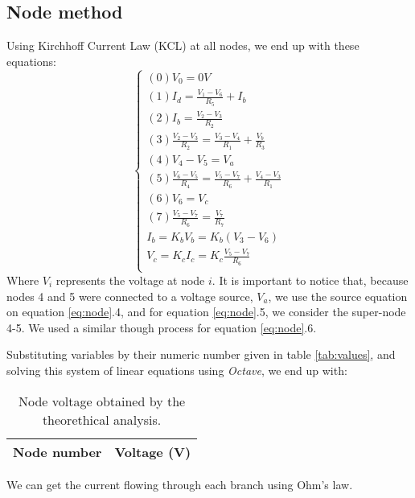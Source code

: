 \subsection{Node method}
Using Kirchhoff Current Law (KCL) at all nodes, we end up with these equations:
\begin{equation}\label{eq:node}
  \begin{cases}
  (0) V_0 = 0V \\
  (1) I_d = \frac{V_1 - V_6}{R_5} + I_b \\
  (2) I_b = \frac{V_2 - V_3}{R_2} \\
  (3) \frac{V_2 - V_3}{R_2} = \frac{V_3 - V_4}{R_1} + \frac{V_b}{R_3} \\
  (4) V_4 - V_5 = V_a \\
  (5) \frac{V_6 - V_5}{R_4} = \frac{V_5 - V_7}{R_6} + \frac{V_4 - V_3}{R_1} \\ %
  (6) V_6 = V_c \\
  (7) \frac{V_5 - V_7}{R_6} = \frac{V_7}{R_7} \\
  I_b = K_bV_b = K_b(V_3 - V_6) \\
  V_c = K_cI_c = K_c \frac{V_5 - V_7}{R_6} \\
\end{cases}
\end{equation}
Where $V_i$ represents the voltage at node $i$. It is important to notice that, because nodes 4 and 5 were connected to a voltage source, $V_a$, we use the source equation on equation \ref{eq:node}.4, and for equation \ref{eq:node}.5, we consider the super-node 4-5. We used a similar though process for equation \ref{eq:node}.6.
\par
Substituting variables by their numeric number given in table \ref{tab:values}, and solving this system of linear equations using \textit{Octave}, we end up with:
\begin{table}[H]
  \centering
  \begin{tabular}{|l|r|}
    \hline    
    {\bf Node number} & {\bf Voltage (V)} \\ \hline
    
  \end{tabular}
  \caption{Node voltage obtained by the theorethical analysis.}
  \label{tab:node}
\end{table}
\par
We can get the current flowing through each branch using Ohm's law.

